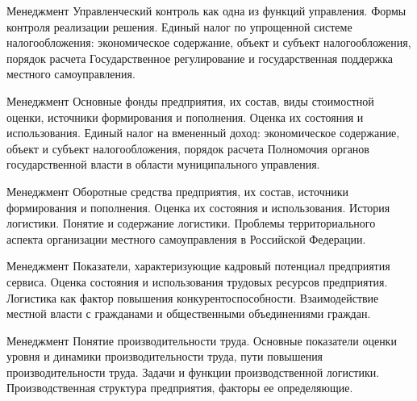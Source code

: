 \documentclass[
	11pt,
	a4paper,
	]
	{article}
\begin{document}
\begin{minipage}[t][\miniH]{\miniL}\centering
	 {Менеджмент}
		{
			Управленческий контроль как одна из функций управления. Формы контроля реализации решения.
		}{
			Единый налог по упрощенной системе налогообложения: экономическое содержание, объект и субъект налогообложения, порядок расчета
		}{
			Государственное регулирование и государственная поддержка местного самоуправления.
		}
	\lowGE
\end{minipage}

\vfill



\begin{minipage}[t][\miniH]{\miniL}\centering
	 {Менеджмент}
		{
			Основные фонды предприятия, их состав, виды стоимостной оценки, источники формирования и пополнения. Оценка их состояния и использования.
		}{
			Единый налог на вмененный доход: экономическое содержание, объект и субъект налогообложения, порядок расчета
		}{
			Полномочия органов государственной власти в области муниципального управления.
		}
	\lowGE
\end{minipage}

\vfill



\begin{minipage}[t][\miniH]{\miniL}\centering
	 {Менеджмент}
		{
			Оборотные средства предприятия, их состав, источники формирования и пополнения. Оценка их состояния и использования.
		}{
			История логистики. Понятие и содержание логистики.
		}{
			Проблемы территориального аспекта организации местного самоуправления в Российской Федерации.
		}
	\lowGE
\end{minipage}





\begin{minipage}[t][\miniH]{\miniL}\centering
	 {Менеджмент}
		{
			Показатели, характеризующие кадровый потенциал предприятия сервиса. Оценка состояния и использования трудовых ресурсов предприятия.
		}{
			Логистика как фактор повышения конкурентоспособности.
		}{
			Взаимодействие местной власти с гражданами и общественными объединениями граждан.
		}
	\lowGE
\end{minipage}

\vfill



\begin{minipage}[t][\miniH]{\miniL}\centering
	 {Менеджмент}
		{
			Понятие производительности труда. Основные показатели оценки уровня и динамики производительности труда, пути повышения производительности труда.
		}{
			Задачи и функции производственной логистики.
		}{
			Производственная структура предприятия, факторы ее определяющие.
		}
	\lowGE
\end{minipage}
\end{document}
